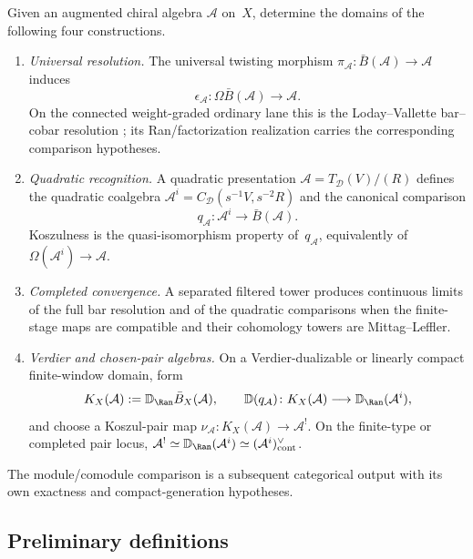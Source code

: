 \begin{question}\label{q:existence-central}
Given an augmented chiral algebra $\mathcal A$ on~$X$, determine the
domains of the following four constructions.
\begin{enumerate}[label=\textup{(E\arabic*)}]
\item \emph{Universal resolution.}  The universal twisting morphism
 $\pi_{\mathcal A}\colon\bar B(\mathcal A)\to\mathcal A$ induces
 \[
  \epsilon_{\mathcal A}\colon
  \Omega\bar B(\mathcal A)\longrightarrow\mathcal A.
 \]
 On the connected weight-graded ordinary lane this is the
 Loday--Vallette bar--cobar resolution
 \cite[Corollary~2.3.4]{LV12}; its Ran/factorization realization carries
 the corresponding comparison hypotheses.
\item \emph{Quadratic recognition.}  A quadratic presentation
 $\mathcal A=T_{\mathcal D}(V)/(R)$ defines the quadratic coalgebra
 $\mathcal A^i=C_{\mathcal D}(s^{-1}V,s^{-2}R)$ and the canonical comparison
 \[
  q_{\mathcal A}\colon\mathcal A^i\longrightarrow\bar B(\mathcal A).
 \]
 Koszulness is the quasi-isomorphism property of~$q_{\mathcal A}$,
 equivalently of $\Omega(\mathcal A^i)\to\mathcal A$.
\item \emph{Completed convergence.}  A separated filtered tower
 produces continuous limits of the full bar resolution and of the
 quadratic comparisons when the finite-stage maps are compatible and
 their cohomology towers are Mittag--Leffler.
\item \emph{Verdier and chosen-pair algebras.}  On a
 Verdier-dualizable or linearly compact finite-window domain, form
 \[
  K_X(\mathcal A):=\mathbb D_{\Ran}\bar B_X(\mathcal A),\qquad
  \mathbb D(q_{\mathcal A})\colon K_X(\mathcal A)
  \longrightarrow\mathbb D_{\Ran}(\mathcal A^i),
 \]
 and choose a Koszul-pair map
 $\nu_{\mathcal A}\colon K_X(\mathcal A)\to\mathcal A^!$.
 On the finite-type or completed pair locus,
 $\mathcal A^!\simeq\mathbb D_{\Ran}(\mathcal A^i)
 \simeq(\mathcal A^i)^\vee_{\mathrm{cont}}$.
\end{enumerate}
The module/comodule comparison is a subsequent categorical output with
its own exactness and compact-generation hypotheses.
\end{question}

\subsection{Preliminary definitions}

